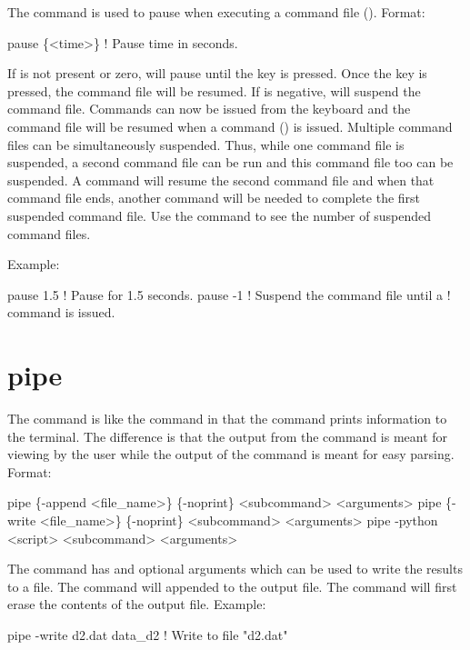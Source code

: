 The  command is used to pause \tao when executing a command file
(). Format:
\begin{example}
  pause \{<time>\} ! Pause time in seconds.
\end{example}

\vskip 10pt
If  is not present or zero, \tao will pause until the  key is pressed. Once the
 key is pressed, the command file will be resumed. If  is negative, \tao will
suspend the command file. Commands can now be issued from the keyboard and the command file will be
resumed when a  command () is issued. Multiple command files can be
simultaneously suspended.  Thus, while one command file is suspended, a second command file can be
run and this command file too can be suspended. A  command will resume the second
command file and when that command file ends, another  command will be needed to
complete the first suspended command file. Use the  command to see the number of
suspended command files.

Example:
\begin{example}
  pause 1.5    ! Pause for 1.5 seconds.
  pause -1     ! Suspend the command file until a  
               !   command is issued.
\end{example}

\section{pipe}
\label{s:pipe}

The  command is like the  command in that the  command prints
information to the terminal. The difference is that the output from the  command is meant
for viewing by the user while the output of the  command is meant for easy
parsing. Format:
\begin{example}
  pipe \{-append <file_name>\} \{-noprint\} <subcommand> <arguments>
  pipe \{-write <file_name>\} \{-noprint\} <subcommand> <arguments>
  pipe -python <script> <subcommand> <arguments>
\end{example}

The  command has  and  optional arguments which can be used to
write the results to a file. The  command will appended to the output file. The
 command will first erase the contents of the output file. Example:
\begin{example}
  pipe -write d2.dat data_d2    ! Write to file "d2.dat"
\end{example}

